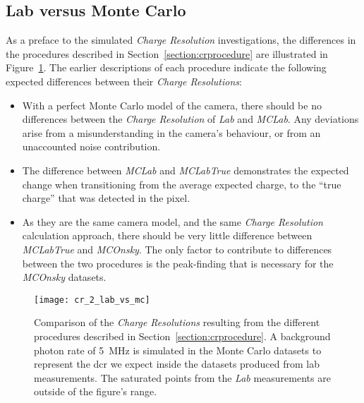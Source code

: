 \subsection{Lab versus Monte Carlo}

As a preface to the simulated \textit{Charge Resolution} investigations, the differences in the procedures described in Section~\ref{section:crprocedure} are illustrated in Figure~\ref{fig:cr_2_lab_vs_mc}. The earlier descriptions of each procedure indicate the following expected differences between their \textit{Charge Resolutions}:
\begin{itemize}
\item With a perfect Monte Carlo model of the camera, there should be no differences between the \textit{Charge Resolution} of \textit{Lab} and \textit{MCLab}. Any deviations arise from a misunderstanding in the camera's behaviour, or from an unaccounted noise contribution.
\item The difference between \textit{MCLab} and \textit{MCLabTrue} demonstrates the expected change when transitioning from the average expected charge, to the ``true charge'' that was detected in the pixel.
\item As they are the same camera model, and the same \textit{Charge Resolution} calculation approach, there should be very little difference between \textit{MCLabTrue} and \textit{MCOnsky}. The only factor to contribute to differences between the two procedures is the peak-finding that is necessary for the \textit{MCOnsky} datasets.
\end{itemize}

\begin{figure}[H]
	\centering
    \texttt{[image: cr\_2\_lab\_vs\_mc]} 
	\caption[Comparison of the different \textit{Charge Resolution} procedures.]{Comparison of the \textit{Charge Resolutions} resulting from the different procedures described in Section~\ref{section:crprocedure}. A background photon rate of \SI{5}{MHz} is simulated in the Monte Carlo datasets to represent the \gls{dcr} we expect inside the datasets produced from lab measurements. The saturated points from the \textit{Lab} measurements are outside of the figure's range.}
	\label{fig:cr_2_lab_vs_mc}
\end{figure}

